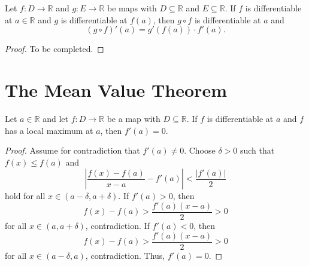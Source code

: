 \begin{theorem}
  Let $f: D \to \mathbb{R}$ and $g: E \to \mathbb{R}$ be maps with
  $D \subseteq \mathbb{R}$ and $E \subseteq \mathbb{R}$.
  If $f$ is differentiable at $a \in \mathbb{R}$ and $g$ is differentiable at
  $f(a)$, then $g \circ f$ is differentiable at $a$ and
  \begin{equation*}
    (g \circ f)'(a) = g'(f(a)) \cdot f'(a).
  \end{equation*}
\end{theorem}
\begin{proof}
  To be completed.
\end{proof}

\section{The Mean Value Theorem}
\begin{theorem}
  Let $a \in \mathbb{R}$ and let $f: D \to \mathbb{R}$ be a map with
  $D \subseteq \mathbb{R}$.
  If $f$ is differentiable at $a$ and $f$ has a local maximum at $a$, then
  $f'(a) = 0$.
\end{theorem}
\begin{proof}
  Assume for contradiction that $f'(a) \neq 0$.
  Choose $\delta > 0$ such that $f(x) \leq f(a)$ and
  \begin{equation*}
    \left|\frac{f(x) - f(a)}{x - a} - f'(a)\right| < \frac{|f'(a)|}{2}
  \end{equation*}
  hold for all $x \in (a - \delta, a + \delta)$.
  If $f'(a) > 0$, then
  \begin{equation*}
    f(x) - f(a) > \frac{f'(a)(x - a)}{2} > 0
  \end{equation*}
  for all $x \in (a, a + \delta)$, contradiction.
  If $f'(a) < 0$, then
  \begin{equation*}
    f(x) - f(a) > \frac{f'(a)(x - a)}{2} > 0
  \end{equation*}
  for all $x \in (a - \delta, a)$, contradiction.
  Thus, $f'(a) = 0$.
\end{proof}